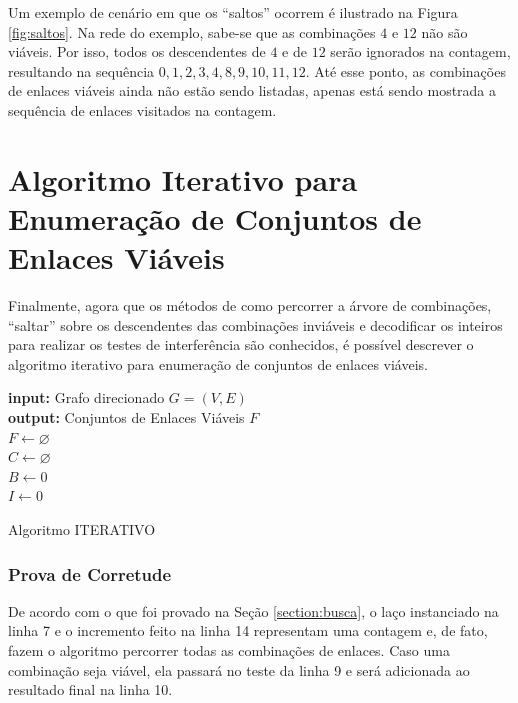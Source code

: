 Um exemplo de cenário em que os ``saltos'' ocorrem é ilustrado na Figura \ref{fig:saltos}. Na rede do exemplo, sabe-se que as combinações $4$ e $12$ não são viáveis. Por isso, todos os descendentes de $4$ e de $12$ serão ignorados na contagem, resultando na sequência $0, 1, 2, 3, 4, 8, 9, 10, 11, 12$. Até esse ponto, as combinações de enlaces viáveis ainda não estão sendo listadas, apenas está sendo mostrada a sequência de enlaces visitados na contagem.

\section{Algoritmo Iterativo para Enumeração de Conjuntos de Enlaces Viáveis}
\label{section:iterativo}

Finalmente, agora que os métodos de como percorrer a árvore de combinações, ``saltar'' sobre os descendentes das combinações inviáveis e decodificar os inteiros para realizar os testes de interferência são conhecidos, é possível descrever o algoritmo iterativo para enumeração de conjuntos de enlaces viáveis.

\begin{algorithm}[h]
	\SetVline
	{\bf input:} Grafo direcionado $G=(V,E)$\\
	{\bf output:} Conjuntos de Enlaces Viáveis $F$\\
	$F \leftarrow \varnothing$\\
	$C \leftarrow \varnothing$\\
	$B \leftarrow 0$\\
	$I \leftarrow 0$\\
\caption{Algoritmo ITERATIVO}
\label{alg:iterativo}
\end{algorithm}

\subsubsection{Prova de Corretude}

De acordo com o que foi provado na Seção \ref{section:busca}, o laço instanciado na linha 7 e o incremento feito na linha 14 representam uma contagem e, de fato, fazem o algoritmo percorrer todas as combinações de enlaces. Caso uma combinação seja viável, ela passará no teste da linha 9 e será adicionada ao resultado final na linha 10.

